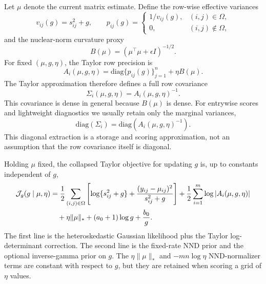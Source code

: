 \documentclass[11pt]{article}
\begin{document}
Let $\mu$ denote the current matrix estimate.  Define the row-wise effective
variances
\begin{equation}
    v_{ij}(g) = s_{ij}^2 + g,
    \qquad
    p_{ij}(g) =
    \begin{cases}
        1/v_{ij}(g), & (i,j)\in\Omega,\\
        0, & (i,j)\notin\Omega,
    \end{cases}
\end{equation}
and the nuclear-norm curvature proxy
\begin{equation}
    B(\mu)
        =
        \left(\mu^\top \mu + \epsilon I\right)^{-1/2}.
\end{equation}
For fixed $(\mu,g,\eta)$, the Taylor row precision is
\begin{equation}
    A_i(\mu,g,\eta)
        =
        \mathrm{diag}\{p_{ij}(g)\}_{j=1}^n
        + \eta B(\mu).
\end{equation}
The Taylor approximation therefore defines a full row covariance
\begin{equation}
    \Sigma_i(\mu,g,\eta)
        =
        A_i(\mu,g,\eta)^{-1}.
\end{equation}
This covariance is dense in general because $B(\mu)$ is dense.  For entrywise
scores and lightweight diagnostics we usually retain only the marginal
variances,
\begin{equation}
    \mathrm{diag}(\Sigma_i)
        =
        \mathrm{diag}\!\left(A_i(\mu,g,\eta)^{-1}\right).
\end{equation}
This diagonal extraction is a storage and scoring approximation, not an
assumption that the row covariance itself is diagonal.

Holding $\mu$ fixed, the collapsed Taylor objective for updating $g$ is,
up to constants independent of $g$,
\begin{align}
    \mathcal{J}_g(g\mid \mu,\eta)
        &=
        \frac{1}{2}
        \sum_{(i,j)\in\Omega}
        \left[
            \log\{s_{ij}^2+g\}
            +
            \frac{(y_{ij}-\mu_{ij})^2}{s_{ij}^2+g}
        \right]
        + \frac{1}{2}\sum_{i=1}^m \log |A_i(\mu,g,\eta)|
        \notag\\
        &\quad
        + \eta\|\mu\|_*
        + (a_0+1)\log g
        + \frac{b_0}{g}.
        \label{eq:hetero-homo-g-objective}
\end{align}
The first line is the heteroskedastic Gaussian likelihood plus the Taylor
log-determinant correction.  The second line is the fixed-rate NND prior and
the optional inverse-gamma prior on $g$.  The $\eta\|\mu\|_*$ and
$-mn\log\eta$ NND-normalizer terms are constant with respect to $g$, but they
are retained when scoring a grid of $\eta$ values.
\end{document}
